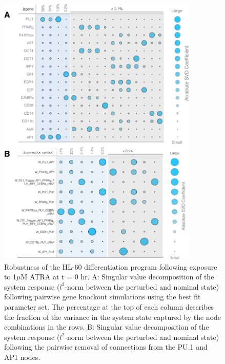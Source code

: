 \documentclass[12pt]{article}
\begin{document}
\begin{figure}[!t]\centering
\includegraphics[width=0.85\textwidth]{./figs/Fig-6-GRN-Robustness.pdf}
\caption{Robustness of the HL-60 differentiation program following exposure to 1$\mu$M ATRA at t = 0 hr.
A: Singular value decomposition of the system response ($l^{2}$-norm between the perturbed and nominal state) following pairwise gene knockout simulations using the best fit parameter set.
The percentage at the top of each column describes the fraction of the variance in the system state captured by the node combinations in the rows.
B: Singular value decomposition of the system response ($l^{2}$-norm between the perturbed and nominal state) following the pairwise removal of connections from the PU.1 and AP1 nodes.}\label{fig:model-response-ko}
\end{figure}
\end{document}
